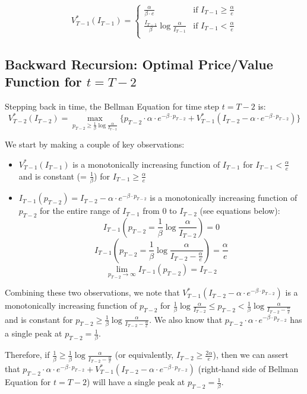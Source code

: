 \documentclass[12pt]{amsart}
\begin{document}
$$
V_{T-1}^*(I_{T-1}) = 
\begin{cases}
\frac {\alpha} {\beta \cdot e} & \text{if } I_{T-1} \geq \frac \alpha e \\
\frac {I_{T-1}} {\beta} \log{ \frac {\alpha} {I_{T-1}}} & \text{if } I_{T-1} < \frac \alpha e\\
\end{cases}
$$

\subsection{Backward Recursion: Optimal Price/Value Function for $t = T-2$} 
   
Stepping back in time, the Bellman Equation for time step $t=T-2$ is:
$$V_{T-2}^*(I_{T-2}) = \max_{p_{T-2} \geq \frac 1 \beta \log \frac \alpha {I_{T-2}}} \{ p_{T-2} \cdot \alpha \cdot e^{-\beta \cdot p_{T-2}}  + V_{T-1}^*(I_{T-2} - \alpha \cdot e^{-\beta \cdot p_{T-2}}) \}$$
 
We start by making a couple of key observations:
\begin{itemize}
\item $V_{T-1}^*(I_{T-1})$ is a monotonically increasing function of $I_{T-1}$ for $I_{T-1} < \frac \alpha e$ and is constant (= $\frac 1 \beta$) for $I_{T-1} \geq \frac \alpha e$
\item $I_{T-1}(p_{T-2}) = I_{T-2} - \alpha \cdot e^{-\beta \cdot p_{T-2}}$ is a monotonically increasing function of $p_{T-2}$ for the entire range of $I_{T-1}$ from $0$ to $I_{T-2}$ (see equations below):
$$I_{T-1}(p_{T-2} = \frac 1 \beta \log \frac \alpha {I_{T-2}}) = 0$$
$$I_{T-1}(p_{T-2} = \frac 1 \beta \log \frac \alpha {I_{T-2} - \frac \alpha e}) = \frac \alpha e$$
$$\lim_{p_{T-2} \to \infty} I_{T-1}(p_{T-2}) = I_{T-2}$$
\end{itemize}

Combining these two observations, we note that $V_{T-1}^*(I_{T-2} - \alpha \cdot e^{-\beta \cdot p_{T-2}})$ is a monotonically increasing function of $p_{T-2}$ for $\frac 1 \beta \log \frac \alpha {I_{T-2}} \leq  p_{T-2} < \frac 1 \beta \log \frac \alpha {I_{T-2} - \frac \alpha e}$ and is constant for $p_{T-2} \geq \frac 1 \beta \log \frac \alpha {I_{T-2} - \frac \alpha e}$. We also know that $p_{T-2} \cdot \alpha \cdot e^{-\beta \cdot p_{T-2}}$ has a single peak at $p_{T-2} = \frac 1 \beta$. 

Therefore, if $\frac 1 \beta \geq \frac 1 \beta \log \frac \alpha {I_{T-2} - \frac \alpha e}$ (or equivalently, $I_{T-2} \geq \frac {2 \alpha} e$), then we can assert that $p_{T-2} \cdot \alpha \cdot e^{-\beta \cdot p_{T-2}}  + V_{T-1}^*(I_{T-2} - \alpha \cdot e^{-\beta \cdot p_{T-2}})$ (right-hand side of Bellman Equation for $t=T-2$) will have a single peak at $p_{T-2} = \frac 1 \beta$.
\end{document}
